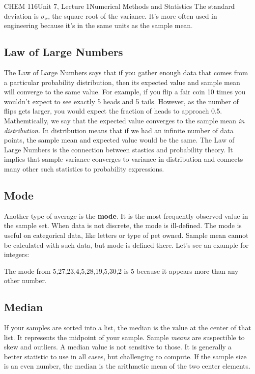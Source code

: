 \documentclass{article}
\begin{document}
\begin{tdoc}{CHEM 116}{Unit 7, Lecture 1}{Numerical Methods and Statistics}
The standard deviation is $\sigma_x$, the square root of the
variance. It's more often used in engineering because it's in the same
units as the sample mean.

\subsection{Law of Large Numbers}

The Law of Large Numbers says that if you gather enough data that comes from a particular probability distribution, then its expected value and sample mean will converge to the same value. For example, if you flip a fair coin 10 times you wouldn't expect to see exactly 5 heads and 5 tails. However, as the number of flips gets larger, you would expect the fraction of heads to approach 0.5. Mathemtically, we say that the expected value converges to the sample mean \textit{in distribution}. In distribution means that if we had an infinite number of data points, the sample mean and expected value would be the same. The Law of Large Numbers is the connection between stastics and probability theory. It implies that sample variance converges to variance in distribution and connects many other such statistics to probability expressions.


\subsection{Mode}
Another type of average is the \textbf{mode}. It is the most frequently observed value in the sample set. When data is not discrete, the mode is ill-defined. The mode is useful on categorical data, like letters or type of pet owned. Sample mean cannot be calculated with such data, but mode is defined there. Let's see an example for integers:

The mode from 5,27,23,4,5,28,19,5,30,2 is 5 because it appears more than any other number.

\subsection{Median}
If your samples are sorted into a list, the median is the value at the
center of that list. It represents the midpoint of your sample. Sample \textit{means} are suspectible to skew and outliers. A median
value is not sensitive to those. It is generally a better
statistic to use in all cases, but challenging to compute. If the sample size is an
even number, the median is the arithmetic mean of the two center
elements.


\end{tdoc}
\end{document}
